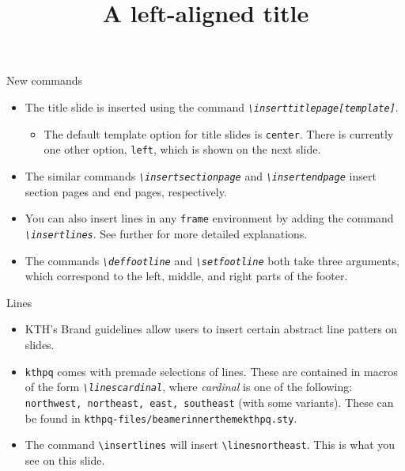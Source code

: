 \documentclass[17pt, t, lualatex]{beamer}
\def\kthpq{\texttt{kthpq}}
\begin{document}
\begin{frame}{New commands}
\begin{itemize}
\item The title slide is inserted using the command \emph{\texttt{\textbackslash inserttitlepage[\textnormal{\textit{template}}]}}.
\begin{itemize}
\item The default template option for title slides is \texttt{center}. There is currently one other option, \texttt{left}, which is shown on the next slide.
\end{itemize}
\item The similar commands \emph{\texttt{\textbackslash insertsectionpage}} and \emph{\texttt{\textbackslash insertendpage}} insert section pages and end pages, respectively.
\item You can also insert lines in any \texttt{frame} environment by adding the command \emph{\texttt{\textbackslash insertlines}}. See further for more detailed explanations.
\item The commands \emph{\texttt{\textbackslash deffootline}} and \emph{\texttt{\textbackslash setfootline}} both take three arguments, which correspond to the left, middle, and right parts of the footer.
\end{itemize}
\end{frame}

\title{A left-aligned title}

\inserttitlepage[left]

\begin{frame}{Lines}
\insertlines
\begin{minipage}{.65\paperwidth}
\begin{itemize}
\item KTH's Brand guidelines allow users to insert certain abstract line patters on slides.
\item \kthpq{} comes with premade selections of lines. These are contained in macros of the form \emph{\texttt{\textbackslash lines\textnormal{\textit{cardinal}}}}, where \textit{cardinal} is one of the following: \texttt{northwest, northeast, east, southeast} (with some variants). These can be found in \texttt{kthpq-files/beamerinnerthemekthpq.sty}.
\item The command \texttt{\textbackslash insertlines} will insert \texttt{\textbackslash linesnortheast}. This is what you see on this slide.
\end{itemize}
\end{minipage}
\end{frame}
\end{document}
